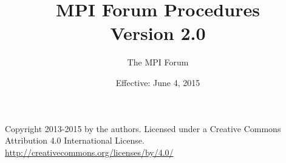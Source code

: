 \documentclass[twoside,fleqn]{book}
\begin{document}
\title{MPI Forum Procedures \\
Version 2.0}
\author{The MPI Forum}
\date{Effective: June 4, 2015}

\maketitle

\null\vfill
\thispagestyle{empty}
\noindent
Copyright 2013-2015 by the authors. Licensed under a
Creative Commons Attribution 4.0 International
License. \url{http://creativecommons.org/licenses/by/4.0/}







\end{document}
